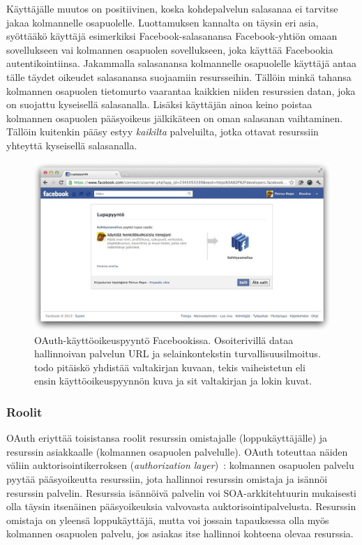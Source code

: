 \documentclass[finnish,gradu]{tktltiki}
\begin{document}
  Käyttäjälle muutos on positiivinen, koska kohdepalvelun salasanaa ei tarvitse jakaa kolmannelle osapuolelle. Luottamuksen kannalta on täysin eri asia, syöttääkö käyttäjä esimerkiksi Facebook-salasanansa Facebook-yhtiön omaan sovellukseen vai kolmannen osapuolen sovellukseen, joka käyttää Facebookia autentikointiinsa. Jakammalla salasanansa kolmannelle osapuolelle käyttäjä antaa tälle täydet oikeudet salasanansa suojaamiin resursseihin. Tällöin minkä tahansa kolmannen osapuolen tietomurto vaarantaa kaikkien niiden resurssien datan, joka on suojattu kyseisellä salasanalla. Lisäksi käyttäjän ainoa keino poistaa kolmannen osapuolen pääsyoikeus jälkikäteen on oman salasanan vaihtaminen. Tällöin kuitenkin pääsy estyy \emph{kaikilta} palveluilta, jotka ottavat resurssiin yhteyttä kyseisellä salasanalla.

  \begin{figure}
    \centering
    \includegraphics[width=1.0\textwidth]{images/facebook_oauth_lupapyynto.jpg}
    \caption{OAuth-käyttöoikeuspyyntö Facebookissa. Osoiterivillä dataa hallinnoivan palvelun URL ja selainkontekstin turvallisuusilmoitus. todo pitäiskö yhdistää valtakirjan kuvaan, tekis vaiheistetun eli ensin käyttöoikeuspyynnön kuva ja sit valtakirjan ja lokin kuvat.}
    \label{fig:facebook_oauth_lupapyynto}
  \end{figure}


  \subsubsection{Roolit} %
  \label{ssub:roolit}

  OAuth eriyttää toisistansa roolit resurssin omistajalle (loppukäyttäjälle) ja resurssin asiakkaalle (kolmannen osapuolen palvelulle). OAuth toteuttaa näiden väliin auktorisointikerroksen (\emph{authorization layer})~\cite{ietf_oauth2}: kolmannen osapuolen palvelu pyytää pääsyoikeutta resurssiin, jota hallinnoi resurssin omistaja ja isännöi resurssin palvelin. Resurssia isännöivä palvelin voi SOA-arkkitehtuurin mukaisesti olla täysin itsenäinen pääsyoikeuksia valvovasta auktorisointipalvelusta. Resurssin omistaja on yleensä loppukäyttäjä, mutta voi jossain tapauksessa olla myös kolmannen osapuolen palvelu, jos asiakas itse hallinnoi kohteena olevaa resurssia.
\end{document}
